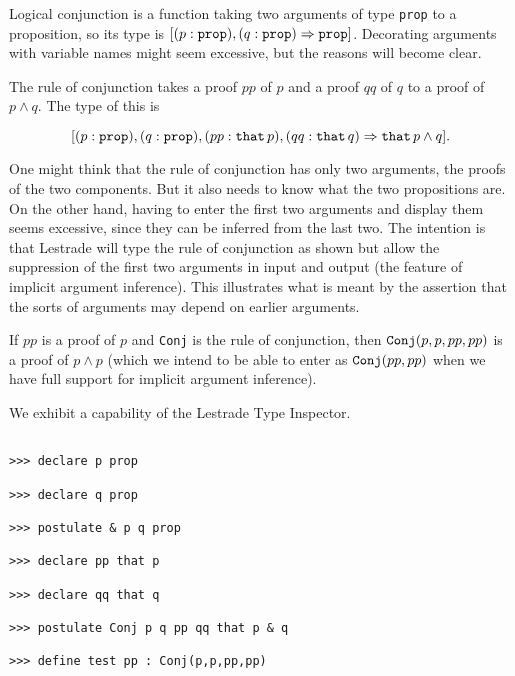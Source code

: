 \documentclass[12pt]{article}
\begin{document}
Logical conjunction is a function taking two arguments of type {\tt prop} to a proposition, so its type is $[(p:{\tt prop}),(q:{\tt prop}) \Rightarrow {\tt prop}]$.  Decorating arguments with variable names might seem excessive, but the reasons will become clear.

The rule of conjunction takes a proof $pp$ of $p$ and a proof $qq$ of $q$ to a proof of $p \wedge q$.    The type of this is 

$$[(p:\verb|prop| ),(q:{\tt prop}),(pp: \verb|that|   \, p),(qq:{\tt that}\, q) \Rightarrow {\tt that}\, p \wedge q].$$

One might think that the rule of conjunction has only two arguments, the proofs of the two components.  But it also needs to know what the two propositions are.  On the other hand, having to enter the first two arguments and display them seems excessive, since they can be inferred from the last two.  The intention is that Lestrade will type the rule of conjunction as shown but allow the suppression of the first two arguments in input and output (the feature of implicit argument inference).  This illustrates what is meant by the assertion that the
sorts of arguments may depend on earlier arguments.

If $pp$ is a proof of $p$ and {\tt Conj} is the rule of conjunction, then ${\tt Conj}(p,p,pp,pp)$ is a proof of $p \wedge p$ (which we intend to be able to enter as ${\tt Conj}(pp,pp)$ when we have full support for implicit argument inference).

We exhibit a capability of the Lestrade Type Inspector.

\begin{verbatim}

>>> declare p prop

>>> declare q prop

>>> postulate & p q prop

>>> declare pp that p

>>> declare qq that q

>>> postulate Conj p q pp qq that p & q

>>> define test pp : Conj(p,p,pp,pp)

\end{verbatim}
\end{document}
